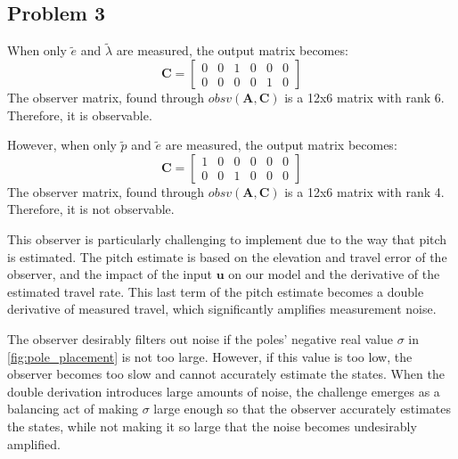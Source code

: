 \subsection{Problem 3}

When only $\tilde{e}$ and $\tilde{\lambda}$ are measured, the output
matrix becomes:
%
\begin{equation*}
  \bm{C} =
  \begin{bmatrix}
    0 & 0 & 1 & 0 & 0 & 0 \\
    0 & 0 & 0 & 0 & 1 & 0
  \end{bmatrix}
\end{equation*}
%
The observer matrix, found through $obsv(\bm{A},\bm{C})$ is a 12x6
matrix with rank 6. Therefore, it is observable.

However, when only $\tilde{p}$ and $\tilde{e}$ are measured, the
output matrix becomes:
%
\begin{equation*}
  \bm{C} =
  \begin{bmatrix}
    1 & 0 & 0 & 0 & 0 & 0 \\
    0 & 0 & 1 & 0 & 0 & 0
  \end{bmatrix}
\end{equation*}
%
The observer matrix, found through $obsv(\bm{A},\bm{C})$ is a 12x6
matrix with rank 4. Therefore, it is not observable.

This observer is particularly challenging to implement due to the way
that pitch is estimated.  The pitch estimate is based on the elevation
and travel error of the observer, and the impact of the input $\bm{u}$
on our model and the derivative of the estimated travel rate.  This
last term of the pitch estimate becomes a double derivative of
measured travel, which significantly amplifies measurement noise.

The observer desirably filters out noise if the poles' negative real
value $\sigma$ in \cref{fig:pole_placement} is not too large. However,
if this value is too low, the observer becomes too slow and cannot
accurately estimate the states. When the double derivation introduces
large amounts of noise, the challenge emerges as a balancing act of
making $\sigma$ large enough so that the observer accurately estimates
the states, while not making it so large that the noise becomes
undesirably amplified.

